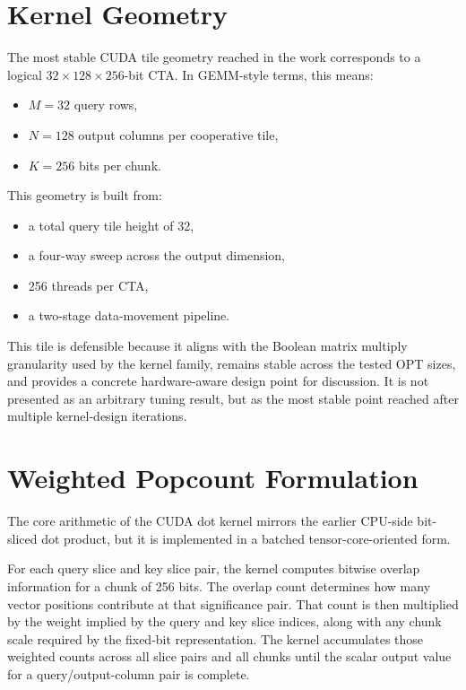 \section{Kernel Geometry}
The most stable CUDA tile geometry reached in the work corresponds to a logical \(32 \times 128 \times 256\)-bit CTA. In GEMM-style terms, this means:

\begin{itemize}[leftmargin=2em]
\item \(M=32\) query rows,
\item \(N=128\) output columns per cooperative tile,
\item \(K=256\) bits per chunk.
\end{itemize}

This geometry is built from:

\begin{itemize}[leftmargin=2em]
\item a total query tile height of 32,
\item a four-way sweep across the output dimension,
\item 256 threads per CTA,
\item a two-stage data-movement pipeline.
\end{itemize}

This tile is defensible because it aligns with the Boolean matrix multiply granularity used by the kernel family, remains stable across the tested OPT sizes, and provides a concrete hardware-aware design point for discussion. It is not presented as an arbitrary tuning result, but as the most stable point reached after multiple kernel-design iterations.

\section{Weighted Popcount Formulation}
The core arithmetic of the CUDA dot kernel mirrors the earlier CPU-side bit-sliced dot product, but it is implemented in a batched tensor-core-oriented form.

For each query slice and key slice pair, the kernel computes bitwise overlap information for a chunk of 256 bits. The overlap count determines how many vector positions contribute at that significance pair. That count is then multiplied by the weight implied by the query and key slice indices, along with any chunk scale required by the fixed-bit representation. The kernel accumulates those weighted counts across all slice pairs and all chunks until the scalar output value for a query/output-column pair is complete.

